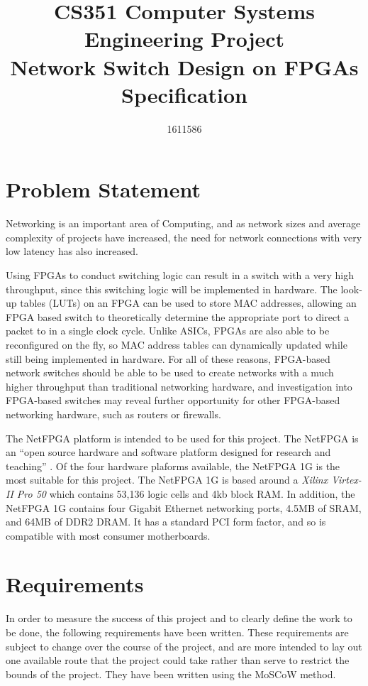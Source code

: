 \documentclass[12pt, a4paper, twoside, onecolumn]{article}
\title{CS351 Computer Systems Engineering Project \\ \vspace{0.5cm} Network Switch Design on FPGAs \\ \vspace{0.3cm} \Large{Specification}}
\author{1611586}
\begin{document}


\tableofcontents
\newpage

\section{Problem Statement}
\label{problem_statement}
Networking is an important area of Computing, and as network sizes and average complexity of projects have increased,
the need for network connections with very low latency has also increased.

Using FPGAs to conduct switching logic can result in a switch with a very high throughput, since this switching logic will be implemented in hardware. The look-up tables (LUTs) on an FPGA can be used to store MAC addresses, allowing an FPGA based switch to theoretically determine the appropriate port to direct a packet to in a single clock cycle. Unlike ASICs, FPGAs are also able to be reconfigured on the fly, so MAC address tables can dynamically updated while still being implemented in hardware.
For all of these reasons, FPGA-based network switches should be able to be used to create networks with a much higher throughput than traditional networking hardware, and investigation into FPGA-based switches may reveal further opportunity for other FPGA-based networking hardware, such as routers or firewalls.

The NetFPGA \cite{NetFPGA} platform is intended to be used for this project. The NetFPGA is an ``open source hardware and software platform designed for research and teaching'' \cite{NetFPGA_about}. Of the four hardware plaforms available, the NetFPGA 1G \cite{NetFPGA_1G} is the most suitable for this project. The NetFPGA 1G is based around a \textit{Xilinx Virtex-II Pro 50} \cite{virtex2-pro} which contains 53,136 logic cells and 4kb block RAM. In addition, the NetFPGA 1G contains four Gigabit Ethernet networking ports, 4.5MB of SRAM, and 64MB of DDR2 DRAM. It has a standard PCI form factor, and so is compatible with most consumer motherboards.

\section{Requirements}
\label{requirements}
In order to measure the success of this project and to clearly define the work to be done, the following requirements have been written. These requirements are subject to change over the course of the project, and are more intended to lay out one available route that the project could take rather than serve to restrict the bounds of the project. They have been written using the MoSCoW method.
\end{document}
